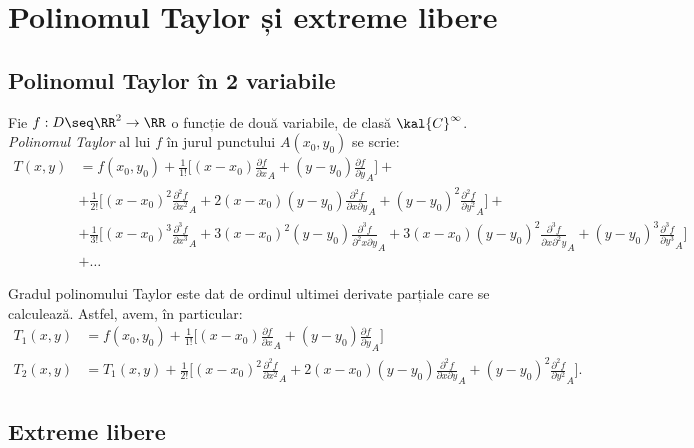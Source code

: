 \chapter{Polinomul Taylor și extreme libere}


\section{Polinomul Taylor în 2 variabile}

Fie $ f : D \seq \RR^2 \to \RR $ o funcție de două variabile,
de clasă $ \kal{C}^\infty $. \emph{Polinomul Taylor} al lui $ f $
în jurul punctului $A(x_0, y_0) $ se scrie:
\begin{align*}
  T(x, y) &= f(x_0, y_0) + \frac{1}{1!} \Big[ (x - x_0) \frac{\partial f}{\partial x}_A + %
            (y - y_0) \frac{\partial f}{\partial y}_A \Big] + \\
          &+ \frac{1}{2!} \Big[ (x - x_0)^2 \frac{\partial^2 f}{\partial x^2}_A + %
            2(x - x_0)(y - y_0) \frac{\partial^2 f}{\partial x \partial y}_A + %
            (y - y_0)^2 \frac{\partial^2 f}{\partial y^2}_A \Big] + \\
          &+ \frac{1}{3!} \Big[ (x - x_0)^3 \frac{\partial^3 f}{\partial x^3}_A + %
            3(x - x_0)^2(y - y_0) \frac{\partial^3 f}{\partial^2 x \partial y}_A + %
            3(x - x_0)(y - y_0)^2 \frac{\partial^3 f}{\partial x \partial^2 y}_A + %
            (y - y_0)^3 \frac{\partial^3 f}{\partial y^3}_A \Big] \\
          &+ \dots
\end{align*}

Gradul polinomului Taylor este dat de ordinul ultimei derivate parțiale
care se calculează. Astfel, avem, în particular:
\begin{align*}
  T_1(x, y) &= f(x_0, y_0) + \frac{1}{1!} \Big[ %
    (x - x_0) \frac{\partial f}{\partial x}_A + %
    (y - y_0) \frac{\partial f}{\partial y}_A \Big] \\
  T_2(x, y) &= T_1(x, y) + \frac{1}{2!} \Big[ %
    (x - x_0)^2 \frac{\partial^2 f}{\partial x^2}_A + %
    2(x - x_0)(y - y_0) \frac{\partial^2 f}{\partial x \partial y}_A + %
    (y - y_0)^2 \frac{\partial^2 f}{\partial y^2}_A \Big].
\end{align*}


\section{Extreme libere}

